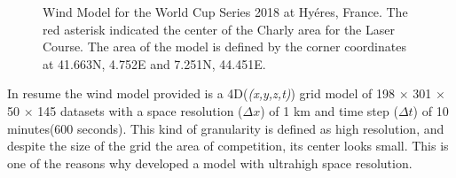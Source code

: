 
\begin{figure} [hb!]
  \centering
  \caption{Wind Model for the World Cup Series 2018 at Hyéres, France. The red asterisk indicated the center of the Charly area for the Laser Course. The area of the model is defined by the corner coordinates at 41.663\degree N, 4.752\degree E and 7.251\degree N, 44.451\degree E.}
\label{fig:wind_model_FR} 
\end{figure}
In resume the wind model provided is a 4D(\textit{(x,y,z,t)}) grid model of 198 $\times$ 301 $\times$ 50 $\times$ 145 datasets with a space resolution ($\Delta x$) of 1 km and time step ($\Delta t$) of 10 minutes(600 seconds). This kind of granularity is defined as high resolution, and despite the size of the grid the area of competition, its center looks small. This is one of the reasons why \cite{giannaros2018ultrahigh} developed a model with ultrahigh space resolution.\par  

